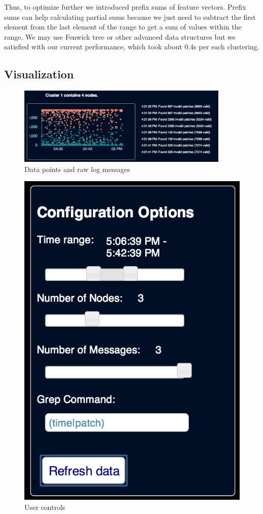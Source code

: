 \documentclass[conference]{style/acmsiggraph}
\begin{document}
Thus, to optimize further we introduced prefix sums of feature vectors. Prefix sums can help
calculating partial sums because we just need to subtract the first element from the last element of
the range to get a sum of values within the range.  We may use Fenwick tree \cite{Fenwick94} or
other advanced data structures but we satisfied with our current performance, which took about 0.4s
per each clustering.

\subsection{Visualization}
\begin{figure}[p]
    \centering
    \includegraphics[width=0.9\textwidth]{images/screenshot_plot.png}
    \caption{Data points and raw log messages}
    \label{fig:ss_plot}
\end{figure}

\begin{figure}[p]
    \centering
    \includegraphics[width=0.7\columnwidth]{images/screenshot_controls.png}
    \caption{User controls}
    \label{fig:ss_controls}
\end{figure}
\end{document}

